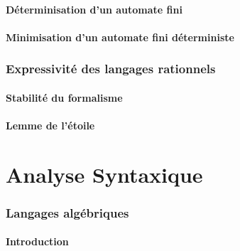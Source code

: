 \subsection{Déterminisation d'un automate fini}




 
\subsection{Minimisation d'un automate fini déterministe}








 
\section{Expressivité des langages rationnels}
 
\subsection{Stabilité du formalisme}



 
\subsection{Lemme de l'étoile}



 
 
\part{Analyse Syntaxique}
 
 
\section{Langages algébriques}
 
\subsection{Introduction}


 
